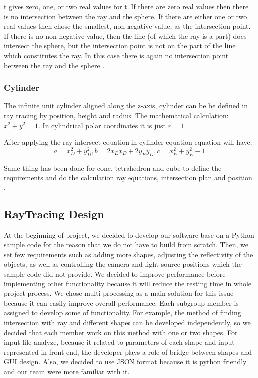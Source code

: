 \documentclass[a4paper, 12pt]{article}
\begin{document}
t gives zero, one, or two real values for t. If there are zero real values then there is no intersection between the ray and the sphere. If there are either one or two real values then chose the smallest, non-negative value, as the intersection point. If there is no non-negative value, then the line (of which the ray is a part) does intersect the sphere, but the intersection point is not on the part of the line which constitutes the ray. In this case there is again no intersection point between the ray and the sphere \cite{Ray tracing primitives}.

\subsubsection{Cylinder}
The infinite unit cylinder aligned along the z-axis, cylinder can be be defined in ray tracing by position, height and radius. The mathematical calculation: $x^2+y^2=1$. In cylindrical polar coordinates it is just $r=1$.

After applying the ray intersect equation in cylinder equation equation will have: 
$$a=x_D^2+y_D^2, b=2 x_E x_D + 2 y_E y_D, c=x_E^2+y_E^2-1$$

Same thing has been done for cone, tetrahedron and cube to define the requirements and  do the calculation ray equations, intersection plan and position \cite{Ray tracing primitives}.

\subsection{RayTracing Design}
At the beginning of project, we decided to develop our software base on a Python sample code \cite{Very simple ray-tracing engine in (almost) pure Python} for the reason that we do not have to build from scratch. Then, we set few requirements such as adding more shapes, adjusting the reflectivity of the objects, as well as controlling the camera and light source positions which the sample code did not provide. We decided to improve performance before implementing other functionality because it will reduce the testing time in whole project process. We chose multi-processing as a main solution for this issue because it can easily improve overall performance. Each subgroup member is assigned to develop some of functionality. For example, the method of finding intersection with ray and different shapes can be developed independently, so we decided that each member work on this method with one or two shapes. For input file analyze, because it related to parameters of each shape and input represented in front end, the developer plays a role of bridge between shapes and GUI design. Also, we decided to use JSON format because it is python friendly and our team were more familiar with it.
\end{document}
